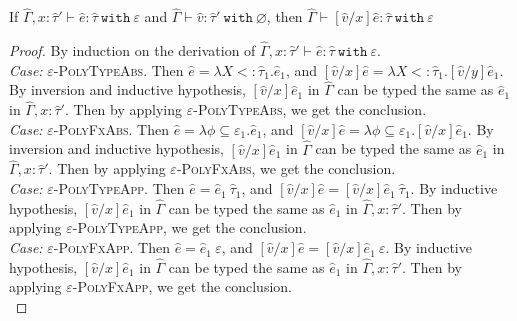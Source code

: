 \documentclass{llncs}
\newcommand{\keywadj}[1]{\mathtt{#1}}
\newcommand{\keyw}[1]{\keywadj{#1}~}
\newcommand{\kw}[1]{\keyw{ #1 }}
\begin{document}
\begin{lemma}
If $\hat \Gamma, x: \hat \tau' \vdash \hat e: \hat \tau~\kw{with} \varepsilon$ and $\hat \Gamma \vdash \hat v: \hat \tau'~\kw{with} \varnothing$, then $\hat \Gamma \vdash [\hat v/x]\hat e: \hat \tau~\kw{with} \varepsilon$
\end{lemma}

\begin{proof} By induction on the derivation of $\hat \Gamma, x: \hat \tau' \vdash \hat e: \hat \tau~\kw{with} \varepsilon$.\\



\textit{Case:} \textsc{$\varepsilon$-PolyTypeAbs}. Then $\hat e = \lambda X <: \hat \tau_1. \hat e_1$, and $[\hat v/x]\hat e = \lambda X <: \hat \tau_1. [\hat v/y]\hat e_1$. By inversion and inductive hypothesis, $[\hat v/x]\hat e_1$ in $\hat \Gamma$ can be typed the same as $\hat e_1$ in $\hat \Gamma, x: \hat \tau'$. Then by applying \textsc{$\varepsilon$-PolyTypeAbs}, we get the conclusion.\\

\textit{Case:} \textsc{$\varepsilon$-PolyFxAbs}. Then $\hat e = \lambda \phi \subseteq \varepsilon_1. \hat e_1$, and $[\hat v/x]\hat e = \lambda \phi \subseteq \varepsilon_1. [\hat v/x]\hat e_1$. By inversion and inductive hypothesis, $[\hat v/x]\hat e_1$ in $\hat \Gamma$ can be typed the same as $\hat e_1$ in $\hat \Gamma, x: \hat \tau'$. Then by applying \textsc{$\varepsilon$-PolyFxAbs}, we get the conclusion. \\


\textit{Case:} \textsc{$\varepsilon$-PolyTypeApp}. Then $\hat e = \hat e_1~\hat \tau_1$, and $[\hat v/x]\hat e = [\hat v/x]\hat e_1~\hat \tau_1$. By inductive hypothesis, $[\hat v/x]\hat e_1$ in $\hat \Gamma$ can be typed the same as $\hat e_1$ in $\hat \Gamma, x: \hat \tau'$. Then by applying \textsc{$\varepsilon$-PolyTypeApp}, we get the conclusion.\\

\textit{Case:} \textsc{$\varepsilon$-PolyFxApp}. Then $\hat e = \hat e_1~\varepsilon$, and $[\hat v/x]\hat e = [\hat v/x]\hat e_1~\varepsilon$. By inductive hypothesis, $[\hat v/x]\hat e_1$ in $\hat \Gamma$ can be typed the same as $\hat e_1$ in $\hat \Gamma, x: \hat \tau'$. Then by applying \textsc{$\varepsilon$-PolyFxApp}, we get the conclusion.\\



\end{proof}
\end{document}
